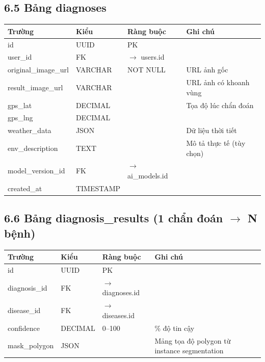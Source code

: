 ﻿\documentclass[12pt,a4paper]{article}
\begin{document}
\subsection*{6.5 Bảng diagnoses}
\begin{longtable}{|p{3.2cm}|p{2.5cm}|p{3cm}|p{5cm}|}
\hline
\rowcolor{headerblue}
\textbf{Trường} & \textbf{Kiểu} & \textbf{Ràng buộc} & \textbf{Ghi chú} \\
\hline
id & UUID & PK & \\
\hline
user\_id & FK & $\rightarrow$ users.id & \\
\hline
original\_image\_url & VARCHAR & NOT NULL & URL ảnh gốc \\
\hline
result\_image\_url & VARCHAR & & URL ảnh có khoanh vùng \\
\hline
gps\_lat & DECIMAL & & Tọa độ lúc chẩn đoán \\
\hline
gps\_lng & DECIMAL & & \\
\hline
weather\_data & JSON & & Dữ liệu thời tiết \\
\hline
env\_description & TEXT & & Mô tả thực tế (tùy chọn) \\
\hline
model\_version\_id & FK & $\rightarrow$ ai\_models.id & \\
\hline
created\_at & TIMESTAMP & & \\
\hline
\end{longtable}

\subsection*{6.6 Bảng diagnosis\_results (1 chẩn đoán $\rightarrow$ N bệnh)}
\begin{longtable}{|p{3cm}|p{2.5cm}|p{3cm}|p{5cm}|}
\hline
\rowcolor{headerblue}
\textbf{Trường} & \textbf{Kiểu} & \textbf{Ràng buộc} & \textbf{Ghi chú} \\
\hline
id & UUID & PK & \\
\hline
diagnosis\_id & FK & $\rightarrow$ diagnoses.id & \\
\hline
disease\_id & FK & $\rightarrow$ diseases.id & \\
\hline
confidence & DECIMAL & 0--100 & \% độ tin cậy \\
\hline
mask\_polygon & JSON & & Mảng tọa độ polygon từ instance segmentation \\
\hline
\end{longtable}
\end{document}
